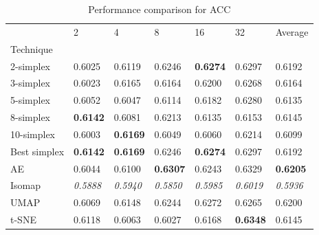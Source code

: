\begin{table}
\caption{Performance comparison for ACC}
\label{tab:results_acc}
\begin{center}
\begin{tabular}{lllllll}
\toprule
 & 2 & 4 & 8 & 16 & 32 & Average \\
Technique &  &  &  &  &  &  \\
\midrule
2-simplex & 0.6025 & 0.6119 & 0.6246 & \textbf{0.6274} & 0.6297 & 0.6192 \\
3-simplex & 0.6023 & 0.6165 & 0.6164 & 0.6200 & 0.6268 & 0.6164 \\
5-simplex & 0.6052 & 0.6047 & 0.6114 & 0.6182 & 0.6280 & 0.6135 \\
8-simplex & \textbf{0.6142} & 0.6081 & 0.6213 & 0.6135 & 0.6153 & 0.6145 \\
10-simplex & 0.6003 & \textbf{0.6169} & 0.6049 & 0.6060 & 0.6214 & 0.6099 \\
Best simplex & \textbf{0.6142} & \textbf{0.6169} & 0.6246 & \textbf{0.6274} & 0.6297 & 0.6192 \\
AE & 0.6044 & 0.6100 & \textbf{0.6307} & 0.6243 & 0.6329 & \textbf{0.6205} \\
Isomap & \textit{0.5888} & \textit{0.5940} & \textit{0.5850} & \textit{0.5985} & \textit{0.6019} & \textit{0.5936} \\
UMAP & 0.6069 & 0.6148 & 0.6244 & 0.6272 & 0.6265 & 0.6200 \\
t-SNE & 0.6118 & 0.6063 & 0.6027 & 0.6168 & \textbf{0.6348} & 0.6145 \\
\bottomrule
\end{tabular}
\end{center}
\end{table}


